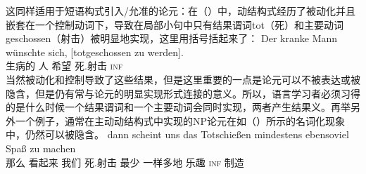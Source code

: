 \begin{exe}
\begin{xlist}[iv.]
\begin{exe}
\begin{xlist}[iv.]
这同样适用于短语构式引入/允准的论元：在（）中，动结构式经历了被动化并且嵌套在一个控制动词下，导致在局部小句中只有结果谓词tot（死）和主要动词geschossen（射击）被明显地实现，这里用括号括起来了：
\ea
\gll Der kranke Mann wünschte sich,   [totgeschossen zu werden].\footnotemark\\
      生病的   人  希望   \self{} \spacebr{}死.射击      \textsc{inf} \passive\\
\z
当然被动化和控制导致了这些结果，但是这里重要的一点是论元可以不被表达或被隐含，但是仍有常与论元的明显实现形式连接的意义\citep[\S~4]{Mueller2007d}。所以，语言学习者必须习得的是什么时候一个结果谓词和一个主要动词会同时实现，两者产生结果义。再举另外一个例子，通常在主动动结构式中实现的NP论元在如（）所示的名词化现象中，仍然可以被隐含。
\eal
\label{ex-tot-schiessen}
\ex 
\gll dann scheint uns das Totschießen mindestens ebensoviel Spaß zu machen\footnotemark\\
     那么 看起来 我们   死.射击 最少 一样多地 乐趣 \textsc{inf} 制造\\
\end{xlist}
\end{exe}
\end{xlist}
\end{exe}
